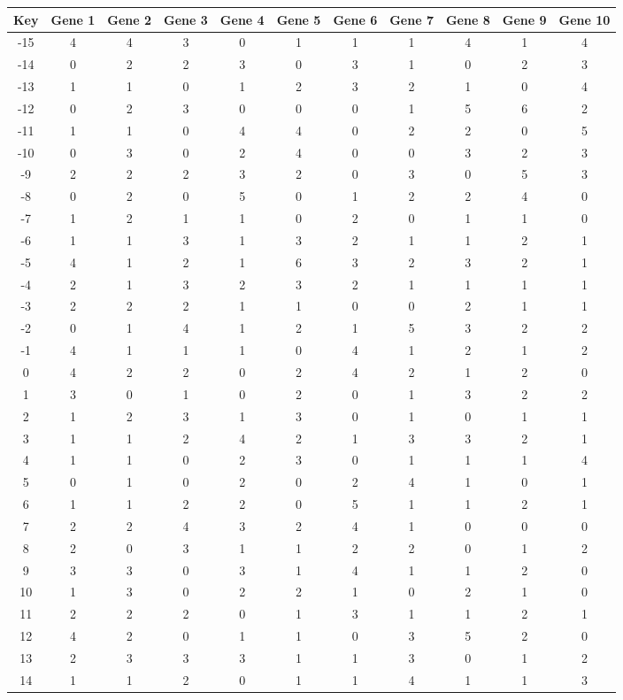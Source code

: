 \begin{tabular}{|c|c|c|c|c|c|c|c|c|c|c|}
\hline
Key & Gene 1 & Gene 2 & Gene 3 & Gene 4 & Gene 5 & Gene 6 & Gene 7 & Gene 8 & Gene 9 & Gene 10 \\
\hline
-15 & 4 & 4 & 3 & 0 & 1 & 1 & 1 & 4 & 1 & 4 \\
-14 & 0 & 2 & 2 & 3 & 0 & 3 & 1 & 0 & 2 & 3 \\
-13 & 1 & 1 & 0 & 1 & 2 & 3 & 2 & 1 & 0 & 4 \\
-12 & 0 & 2 & 3 & 0 & 0 & 0 & 1 & 5 & 6 & 2 \\
-11 & 1 & 1 & 0 & 4 & 4 & 0 & 2 & 2 & 0 & 5 \\
-10 & 0 & 3 & 0 & 2 & 4 & 0 & 0 & 3 & 2 & 3 \\
-9 & 2 & 2 & 2 & 3 & 2 & 0 & 3 & 0 & 5 & 3 \\
-8 & 0 & 2 & 0 & 5 & 0 & 1 & 2 & 2 & 4 & 0 \\
-7 & 1 & 2 & 1 & 1 & 0 & 2 & 0 & 1 & 1 & 0 \\
-6 & 1 & 1 & 3 & 1 & 3 & 2 & 1 & 1 & 2 & 1 \\
-5 & 4 & 1 & 2 & 1 & 6 & 3 & 2 & 3 & 2 & 1 \\
-4 & 2 & 1 & 3 & 2 & 3 & 2 & 1 & 1 & 1 & 1 \\
-3 & 2 & 2 & 2 & 1 & 1 & 0 & 0 & 2 & 1 & 1 \\
-2 & 0 & 1 & 4 & 1 & 2 & 1 & 5 & 3 & 2 & 2 \\
-1 & 4 & 1 & 1 & 1 & 0 & 4 & 1 & 2 & 1 & 2 \\
0 & 4 & 2 & 2 & 0 & 2 & 4 & 2 & 1 & 2 & 0 \\
1 & 3 & 0 & 1 & 0 & 2 & 0 & 1 & 3 & 2 & 2 \\
2 & 1 & 2 & 3 & 1 & 3 & 0 & 1 & 0 & 1 & 1 \\
3 & 1 & 1 & 2 & 4 & 2 & 1 & 3 & 3 & 2 & 1 \\
4 & 1 & 1 & 0 & 2 & 3 & 0 & 1 & 1 & 1 & 4 \\
5 & 0 & 1 & 0 & 2 & 0 & 2 & 4 & 1 & 0 & 1 \\
6 & 1 & 1 & 2 & 2 & 0 & 5 & 1 & 1 & 2 & 1 \\
7 & 2 & 2 & 4 & 3 & 2 & 4 & 1 & 0 & 0 & 0 \\
8 & 2 & 0 & 3 & 1 & 1 & 2 & 2 & 0 & 1 & 2 \\
9 & 3 & 3 & 0 & 3 & 1 & 4 & 1 & 1 & 2 & 0 \\
10 & 1 & 3 & 0 & 2 & 2 & 1 & 0 & 2 & 1 & 0 \\
11 & 2 & 2 & 2 & 0 & 1 & 3 & 1 & 1 & 2 & 1 \\
12 & 4 & 2 & 0 & 1 & 1 & 0 & 3 & 5 & 2 & 0 \\
13 & 2 & 3 & 3 & 3 & 1 & 1 & 3 & 0 & 1 & 2 \\
14 & 1 & 1 & 2 & 0 & 1 & 1 & 4 & 1 & 1 & 3 \\
\hline
\end{tabular}